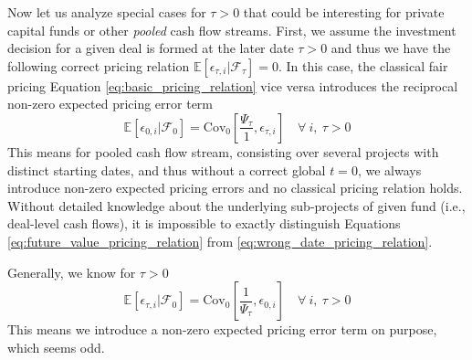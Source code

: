 \documentclass[12pt]{article}
\begin{document}
Now let us analyze special cases for $\tau > 0$ that could be interesting for private capital funds or other \emph{pooled} cash flow streams.
First, we assume the investment decision for a given deal is formed at the later date $\tau > 0$ and thus we have the following correct pricing relation $\mathbb{E} \left[ \epsilon_{\tau,i} \left| \mathcal{F}_{\tau} \right. \right] = 0$.
In this case, the classical fair pricing Equation \ref{eq:basic_pricing_relation} vice versa introduces the reciprocal non-zero expected pricing error term 
\begin{equation}
	\label{eq:wrong_date_pricing_relation}
	\mathbb{E} \left[ 
	\epsilon_{0,i}
	\left| \mathcal{F}_{0} \right.
	\right] = 
	\mathrm{Cov}_{0} \left[ \frac{\Psi_{\tau}}{1}, \epsilon_{\tau,i} \right]
	\quad \forall \ i, \ \tau > 0
\end{equation}
This means for pooled cash flow stream, consisting over several projects with distinct starting dates, and thus without a correct global $t=0$, we always introduce  non-zero expected pricing errors and no classical pricing relation holds.
Without detailed knowledge about the underlying sub-projects of given fund (i.e., deal-level cash flows), it is impossible to exactly distinguish Equations \ref{eq:future_value_pricing_relation} from \ref{eq:wrong_date_pricing_relation}.

Generally, we know for $\tau > 0$
\begin{equation}
	\label{eq:future_value_pricing_relation}
	\mathbb{E} \left[ 
	\epsilon_{\tau,i}
	\left| \mathcal{F}_{0} \right.
	\right] = 
	\mathrm{Cov}_0 \left[ \frac{1}{\Psi_{\tau}}, \epsilon_{0,i} \right]
	\quad \forall \ i, \ \tau > 0
\end{equation}
This means we introduce a non-zero expected pricing error term on purpose, which seems odd.

\fi
\end{document}
